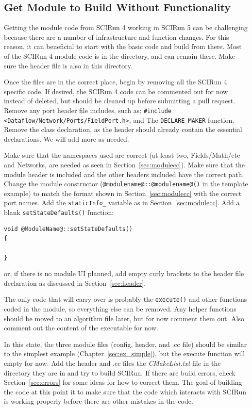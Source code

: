 \documentclass[fleqn,11pt,openany]{book}
\begin{document}
\subsection{Get Module to Build Without Functionality}

Getting the module code from SCIRun 4 working in SCIRun 5 can be challenging because there are a number of infrastructure and function changes.  
For this reason, it can beneficial to start with the basic code and build from there.  
Most of the SCIRun 4 module code is in the  \emph{} directory, and can remain there.  
Make sure the header file is also in this directory.  

Once the files are in the correct place, begin by removing all the SCIRun 4 specific code. 
If desired, the SCIRun 4 code can be commented out for now instead of deleted, but should be cleaned up before submitting a pull request.  
Remove any port header file includes, such as: \verb|#include <Dataflow/Network/Ports/FieldPort.h>|, and The \verb|DECLARE_MAKER| function.
Remove the class declaration, as the header should already contain the essential declarations.
We will add more as needed.  

Make sure that the namespaces used are correct (at least two, Fields/Math/etc and Networks, are needed as seen in Section~\ref{sec:modulecc}).
Make sure that the module header is included and the other headers included have the correct path. 
Change the module constructor (\verb|@modulename@::@modulename@()| in the template example) to match the format shown in Section~\ref{sec:modulecc} with the correct port names.
Add the \verb|staticInfo_| variable as in Section~\ref{sec:modulecc}.
Add a blank \verb|setStateDefaults()| function:
\begin{verbatim}
void @ModuleName@::setStateDefaults()
{
 
}
\end{verbatim}
or, if there is no module UI planned, add empty curly brackets to the header file declaration as discussed in Section~\ref{sec:header}.  

The only code that will carry over is probably the \verb|execute()| and other functions coded in the module, so everything else can be removed. 
Any helper functions should be moved to an algorithm file later, but for now comment them out.
Also comment out the content of the executable for now.  

In this state, the three module files (config, header, and .cc file) should be similar to the simplest example (Chapter~\ref{sec:ex_simple}), but the execute function will empty for now. 
Add the header and .cc files the \emph{CMakeList.txt} file in the directory they are in and try to build SCIRun.
If there are build errors, check Section~\ref{sec:errors} for some ideas for how to correct them.  
The goal of building the code at this point it to make sure that the code which interacts with SCIRun is working properly before there are other mistakes in the code.
\end{document}
